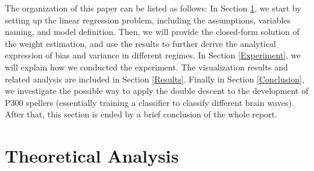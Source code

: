 \documentclass{article}
\begin{document}
\vspace{-3mm}
The organization of this paper can be listed as follows: In Section \ref{Theoretical}, we start by setting up the linear regression problem, including the assumptions, variables naming, and model definition. Then, we will provide the closed-form solution of the weight estimation, and use the results to further derive the analytical expression of bias and variance in different regimes. In Section \ref{Experiment}, we will explain how we conducted the experiment. The visualization results and related analysis are included in Section \ref{Results}. Finally in Section \ref{Conclusion}, we investigate the possible way to apply the double descent to the development of P300 spellers (essentially training a classifier to classify different brain waves). After that, this section is ended by a brief conclusion of the whole report.


\section{Theoretical Analysis} \label{Theoretical}
\end{document}
